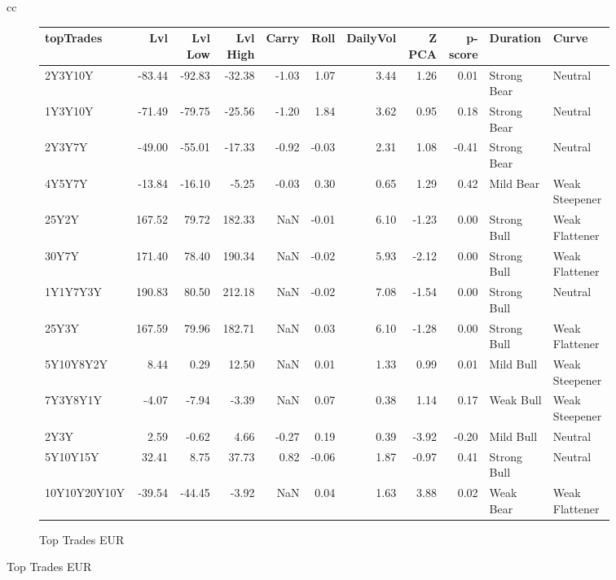 \documentclass[a4paper,twoside]{report}
\begin{document}
\begin{figure}[htbp]
\begin{tabular}[c]{cc}
\begin{subfigure}[c]{0.5\textwidth}
\caption{Top Trades EUR}
\label{fig:TopTrades EUR}
\begin{adjustbox}{max width=\textwidth}
\begin{tabular}{lrrrrrrrrll}
\hline
    topTrades &     Lvl &  Lvl Low &  Lvl High &  Carry &  Roll &  DailyVol &  Z PCA &  p-score &     Duration &           Curve \\
\hline
      2Y3Y10Y &  -83.44 &   -92.83 &    -32.38 &  -1.03 &  1.07 &      3.44 &   1.26 &     0.01 &  Strong Bear &         Neutral \\
      1Y3Y10Y &  -71.49 &   -79.75 &    -25.56 &  -1.20 &  1.84 &      3.62 &   0.95 &     0.18 &  Strong Bear &         Neutral \\
       2Y3Y7Y &  -49.00 &   -55.01 &    -17.33 &  -0.92 & -0.03 &      2.31 &   1.08 &    -0.41 &  Strong Bear &         Neutral \\
       4Y5Y7Y &  -13.84 &   -16.10 &     -5.25 &  -0.03 &  0.30 &      0.65 &   1.29 &     0.42 &    Mild Bear &  Weak Steepener \\
        25Y2Y &  167.52 &    79.72 &    182.33 &    NaN & -0.01 &      6.10 &  -1.23 &     0.00 &  Strong Bull &  Weak Flattener \\
        30Y7Y &  171.40 &    78.40 &    190.34 &    NaN & -0.02 &      5.93 &  -2.12 &     0.00 &  Strong Bull &  Weak Flattener \\
     1Y1Y7Y3Y &  190.83 &    80.50 &    212.18 &    NaN & -0.02 &      7.08 &  -1.54 &     0.00 &  Strong Bull &         Neutral \\
        25Y3Y &  167.59 &    79.96 &    182.71 &    NaN &  0.03 &      6.10 &  -1.28 &     0.00 &  Strong Bull &  Weak Flattener \\
    5Y10Y8Y2Y &    8.44 &     0.29 &     12.50 &    NaN &  0.01 &      1.33 &   0.99 &     0.01 &    Mild Bull &  Weak Steepener \\
     7Y3Y8Y1Y &   -4.07 &    -7.94 &     -3.39 &    NaN &  0.07 &      0.38 &   1.14 &     0.17 &    Weak Bull &  Weak Steepener \\
         2Y3Y &    2.59 &    -0.62 &      4.66 &  -0.27 &  0.19 &      0.39 &  -3.92 &    -0.20 &    Mild Bull &         Neutral \\
     5Y10Y15Y &   32.41 &     8.75 &     37.73 &   0.82 & -0.06 &      1.87 &  -0.97 &     0.41 &  Strong Bull &         Neutral \\
 10Y10Y20Y10Y &  -39.54 &   -44.45 &     -3.92 &    NaN &  0.04 &      1.63 &   3.88 &     0.02 &    Weak Bear &  Weak Flattener \\

\end{tabular}
\end{adjustbox}
\end{subfigure}
\end{tabular}
\end{figure}
\end{document}
